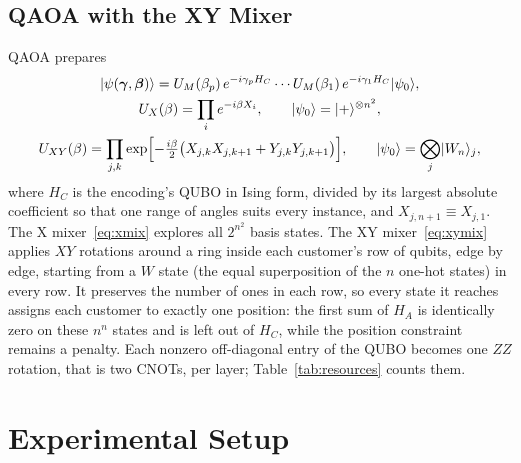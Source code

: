 \subsection{QAOA with the XY Mixer}\label{sec:xy}
QAOA prepares
\begin{gather}
  \lvert\psi(\boldsymbol\gamma,\boldsymbol\beta)\rangle
    = U_M(\beta_p)\,e^{-i\gamma_p H_C}\cdots U_M(\beta_1)\,e^{-i\gamma_1 H_C}\lvert\psi_0\rangle, \label{eq:qaoa}\\
  U_X(\beta) = \prod_{i} e^{-i\beta X_i}, \qquad \lvert\psi_0\rangle = \lvert+\rangle^{\otimes n^2}, \label{eq:xmix}\\
  U_{XY}(\beta) = \prod_{j,k}
     \exp\Bigl[-\tfrac{i\beta}{2}\bigl(X_{j,k}X_{j,k+1} + Y_{j,k}Y_{j,k+1}\bigr)\Bigr],
  \qquad \lvert\psi_0\rangle = \bigotimes_{j}\lvert W_n\rangle_j, \label{eq:xymix}
\end{gather}
where $H_C$ is the encoding's QUBO in Ising form, divided by its largest absolute coefficient so that one
range of angles suits every instance, and $X_{j,n+1}\equiv X_{j,1}$. The X mixer~\eqref{eq:xmix} explores all $2^{n^2}$ basis states. The XY
mixer~\eqref{eq:xymix}~\cite{hadfield2019qaoa,wang2020xy} applies $XY$ rotations around a ring
inside each customer's row of qubits, edge by edge, starting from a $W$ state (the equal
superposition of the $n$ one-hot states) in every row. It preserves the number of ones in each
row, so every state it reaches assigns each customer to exactly one position: the first sum of
$H_A$ is identically zero on these $n^n$ states and is left out of $H_C$, while the position
constraint remains a penalty. Each nonzero off-diagonal entry of the QUBO becomes one $ZZ$
rotation, that is two CNOTs, per layer; Table~\ref{tab:resources} counts them.

\section{Experimental Setup}\label{sec:setup}

